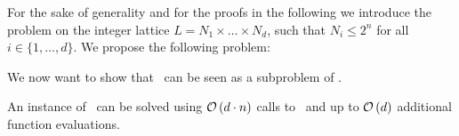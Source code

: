 For the sake of generality and for the proofs in the following we introduce the problem on the integer lattice $L = N_1 \times \dots \times N_d$, such that $N_i \leq 2^n$ for all $i \in \{1, \dots, d\}$. We propose the following problem:

We now want to show that \Tarskistar\ can be seen as a subproblem of \Tarski.
\begin{claim}
    An instance of \Tarski\ can be solved using $\mathcal{O}\left(d\cdot n\right)$ calls to \Tarskistar\ and up to $\mathcal{O}\left(d\right)$ additional function evaluations.
\end{claim}
